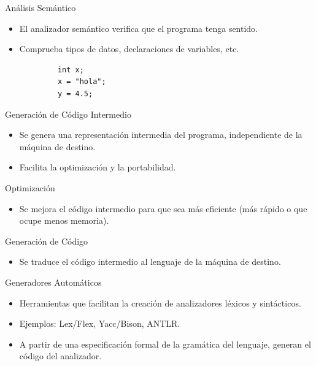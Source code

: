 \documentclass{beamer}
\begin{document}
	
	\begin{frame}[fragile]{Análisis Semántico}
		
		\begin{itemize}
			\item El analizador semántico verifica que el programa tenga sentido.
			\item Comprueba tipos de datos, declaraciones de variables, etc.
		\end{itemize}
		\pause
		\begin{verbatim}
			int x;
			x = "hola";
			y = 4.5;
		\end{verbatim}
	\end{frame}
	
	\begin{frame}{Generación de Código Intermedio}
		
		\begin{itemize}
			\item Se genera una representación intermedia del programa, independiente de la máquina de destino.
			\item Facilita la optimización y la portabilidad.
		\end{itemize}
		
	\end{frame}
	
	\begin{frame}{Optimización}
		
		\begin{itemize}
			\item Se mejora el código intermedio para que sea más eficiente (más rápido o que ocupe menos memoria).
		\end{itemize}
		
	\end{frame}
	
	\begin{frame}{Generación de Código}
		
		\begin{itemize}
			\item Se traduce el código intermedio al lenguaje de la máquina de destino.
		\end{itemize}
		
	\end{frame}
	
	\begin{frame}{Generadores Automáticos}
		
		\begin{itemize}
			\item Herramientas que facilitan la creación de analizadores léxicos y sintácticos.
			\item Ejemplos: Lex/Flex, Yacc/Bison, ANTLR.
			\item A partir de una especificación formal de la gramática del lenguaje, generan el código del analizador.
		\end{itemize}
		
	\end{frame}
	
\end{document}
